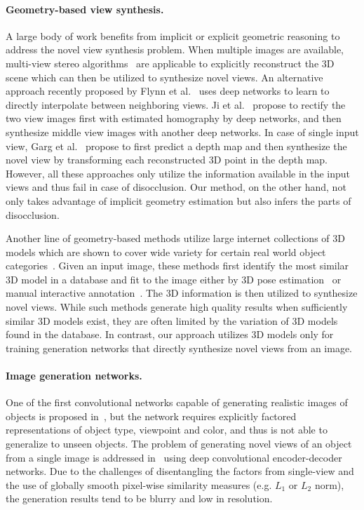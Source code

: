 \documentclass[10pt,twocolumn,letterpaper]{article}
\begin{document}
\vspace{-1mm}
\paragraph{Geometry-based view synthesis.}
A large body of work benefits from implicit or explicit geometric reasoning to address the novel view synthesis problem. When multiple images are available, multi-view stereo algorithms~\cite{furukawa_mvs} are applicable to explicitly reconstruct the 3D scene which can then be utilized to synthesize novel views. An alternative approach recently proposed by Flynn et al.~\cite{flynn2015deepstereo} uses deep networks to learn to directly interpolate between neighboring views. Ji et al.~\cite{ji_cvpr2017} propose to rectify the two view images first with estimated homography by deep networks, and then synthesize middle view images with another deep networks. In case of single input view, Garg et al.~\cite{garg_eccv2016} propose to first predict a depth map and then synthesize the novel view by transforming each reconstructed 3D point in the depth map. However, all these approaches only utilize the information available in the input views and thus fail in case of disocclusion. Our method, on the other hand, not only takes advantage of implicit geometry estimation but also infers the parts of disocclusion.

Another line of geometry-based methods utilize large internet collections of 3D models which are shown to cover wide variety for certain real world object categories~\cite{OM3D2014,rematas2016novel}. Given an input image, these methods first identify the most similar 3D model in a database and fit to the image either by 3D pose estimation~\cite{rematas2016novel} or manual interactive annotation~\cite{OM3D2014}. The 3D information is then utilized to synthesize novel views. While such methods generate high quality results when sufficiently similar 3D models exist, they are often limited by the variation of 3D models found in the database. In contrast, our approach utilizes 3D models only for training generation networks that directly synthesize novel views from an image.

\vspace{-1mm}
\paragraph{Image generation networks.}
One of the first convolutional networks capable of generating realistic images of objects is proposed in~\cite{Dosovitskiy_cvpr2015}, but the network requires explicitly factored representations of object type, viewpoint and color, and thus is not able to generalize to unseen objects. 
The problem of generating novel views of an object from a single image is addressed in~\cite{yang_nips2015,kulkarni_nips2015,tatarchenko_eccv2016} using deep convolutional encoder-decoder networks. Due to the challenges of disentangling the factors from single-view and the use of globally smooth pixel-wise similarity measures (e.g. $L_1$ or $L_2$ norm), the generation results tend to be blurry and low in resolution. 
\end{document}
